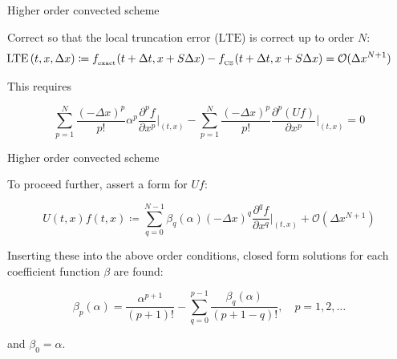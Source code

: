\documentclass{beamer}
\begin{document}
 
\begin{frame}{Higher order convected scheme}

Correct so that the local truncation error ($\mathrm{LTE}$) is correct up to order $N$:
$$\hspace*{-6.5mm}\mathrm{LTE}\,(t,x,\Delta x) \coloneqq f_{_{\mathrm{exact}}}(t + \Delta t,x + S\Delta x) - f_{_{\mathrm{CS}}}(t + \Delta t,x + S\Delta x) = \mathcal{O}(\Delta x^{N+1})$$

This requires 

$$\sum_{p = 1}^{N} \frac{(-\Delta x)^p}{p!}\alpha^p \frac{\partial^p f}{\partial x^p}\biggr|_{(t,x)} -\sum_{p = 1}^{N} \frac{(-\Delta x)^p}{p!} \frac{\partial^p(Uf)}{\partial x^p}\biggr|_{(t,x)} = 0$$
 

\end{frame}
 
\begin{frame}{Higher order convected scheme}

To proceed further, assert a form for $Uf$:

$$U(t,x)f(t,x) \coloneqq \sum_{q = 0}^{N-1} \beta_q(\alpha )(-\Delta x)^q\frac{\partial^q f}{\partial x^q}\biggr|_{(t,x)} + \mathcal{O}(\Delta x^{N+1})$$

Inserting these into the above order conditions, closed form solutions for each coefficient function $\beta$ are found:

$$\beta_p(\alpha ) = \frac{\alpha^{p+1}}{(p+1)!} - \sum_{q = 0}^{p - 1}\frac{\beta_q(\alpha )}{(p + 1 - q)!}, \quad p = 1,2,\ldots $$
 
and $\beta_0 = \alpha$. 

\end{frame}
 
\end{document}
